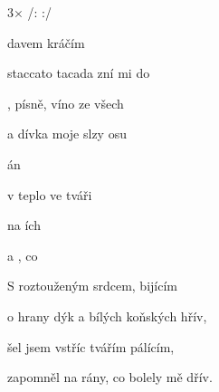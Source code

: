 

3× /:     :/

\zs
{} davem kráčím 

staccato tacada zní mi do 

, písně, víno ze všech 

a dívka  moje slzy osu
\ks

\zr
{} án

v  teplo  ve tváři 

na ích  

a , co  
\kr

\zs
S roztouženým srdcem, bijícím

o hrany dýk a bílých koňských hřív,

šel jsem vstříc tvářím pálícím,

zapomněl na rány, co bolely mě dřív.
\ks

\zr\kr

\kp
